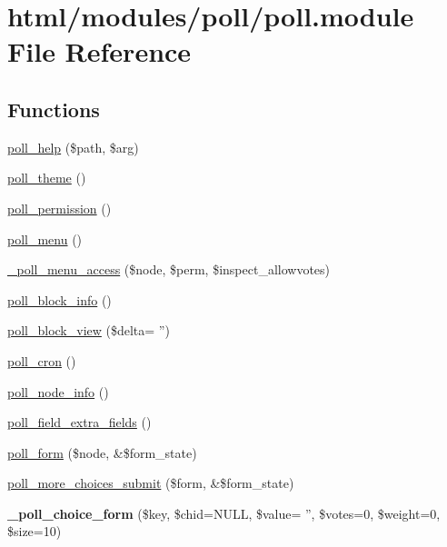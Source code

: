 \hypertarget{poll_8module}{
\section{html/modules/poll/poll.module File Reference}
\label{poll_8module}
}
\subsection*{Functions}
\begin{DoxyCompactItemize}
\item 
\hyperlink{poll_8module_a27ad4deda5a024a714aca172f2f6451d}{poll\_\-help} (\$path, \$arg)
\item 
\hyperlink{poll_8module_a05317f75289b6caeeeda960dad1e3b33}{poll\_\-theme} ()
\item 
\hyperlink{poll_8module_a848a374097349473b6bfe2456bdad331}{poll\_\-permission} ()
\item 
\hyperlink{poll_8module_abd4f2d36dc91b4265472740ca890fa62}{poll\_\-menu} ()
\item 
\hyperlink{poll_8module_a9f16785bb065564551ba5efdd96bf81e}{\_\-poll\_\-menu\_\-access} (\$node, \$perm, \$inspect\_\-allowvotes)
\item 
\hyperlink{poll_8module_a60252160c13653f09164b7893b9bddc8}{poll\_\-block\_\-info} ()
\item 
\hyperlink{poll_8module_af46691a907c59444fd977935acef5166}{poll\_\-block\_\-view} (\$delta= '')
\item 
\hyperlink{poll_8module_aa409a9bf9aea33408f80359e06217fd9}{poll\_\-cron} ()
\item 
\hyperlink{poll_8module_a24046bf2bb6bbc96b205eff7c093a5a8}{poll\_\-node\_\-info} ()
\item 
\hyperlink{poll_8module_a7719263baee7eed1b9dc2e6c0e5e0f76}{poll\_\-field\_\-extra\_\-fields} ()
\item 
\hyperlink{poll_8module_a32cd2c5b13bfc397270c31e2d26765de}{poll\_\-form} (\$node, \&\$form\_\-state)
\item 
\hyperlink{poll_8module_ae339bb6acfe80a22326439034dd04a4c}{poll\_\-more\_\-choices\_\-submit} (\$form, \&\$form\_\-state)
\item 
\hypertarget{poll_8module_a787479b208b8399f04f4d6127684ed63}{
{\bfseries \_\-poll\_\-choice\_\-form} (\$key, \$chid=NULL, \$value= '', \$votes=0, \$weight=0, \$size=10)}
\label{poll_8module_a787479b208b8399f04f4d6127684ed63}


\end{DoxyCompactItemize}
